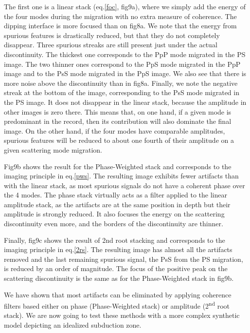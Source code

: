 \documentclass[9pt,a4paper]{article}
\numberwithin{equation}{section}
\begin{document}
\begin{multicols}{2}
The first one is a linear stack (eq.\eqref{foc}, fig9a), where we simply add the energy of the four modes during the migration with no extra measure of coherence.
The dipping interface is more focused than on fig8a.
We note that the energy from spurious features is drastically reduced, but that they do not completely disappear.
Three spurious streaks are still present just under the actual discontinuity.
The thickest one corresponds to the PpP mode migrated in the PS image.
The two thinner ones correspond to the PpS mode migrated in the PpP image and to the PsS mode migrated in the PpS image.
We also see that there is more noise above the discontinuity than in fig8a.
Finally, we note the negative streak at the bottom of the image, corresponding to the PsS mode migrated in the PS image.
It does not disappear in the linear stack, because the amplitude in other images is zero there.
This means that, on one hand, if a given mode is predominant in the record, then its contribution will also dominate the final image.
On the other hand, if the four modes have comparable amplitudes, spurious features will be reduced to about one fourth of their amplitude on a given scattering mode migration.

Fig9b shows the result for the Phase-Weighted stack and corresponds to the imaging principle in eq.\eqref{pws}.
The resulting image exhibits fewer artifacts than with the linear stack, as most spurious signals do not have a coherent phase over the 4 modes.
The phase stack virtually acts as a filter applied to the linear amplitude stack, as the artifacts are at the same position in depth but their amplitude is strongly reduced.
It also focuses the energy on the scattering discontinuity even more, and the borders of the discontinuity are thinner.

Finally, fig9c shows the result of 2nd root stacking and corresponds to the imaging principle in eq.\eqref{2rs}.
The resulting image has almost all the artifacts removed and the last remaining spurious signal, the PsS from the PS migration, is reduced by an order of magnitude.
The focus of the positive peak on the scattering discontinuity is the same as for the Phase-Weighted stack in fig9b.

We have shown that most artifacts can be eliminated by applying coherence filters based either on phase (Phase-Weighted stack) or amplitude (2\textsuperscript{nd} root stack).
We are now going to test these methods with a more complex synthetic model depicting an idealized subduction zone.


\end{multicols}
\end{document}
